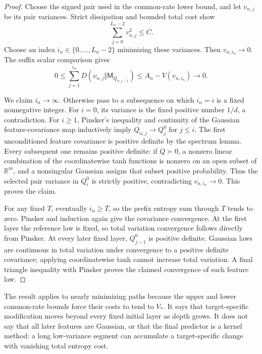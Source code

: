 \begin{proof}
Choose the signed pair used in the common-rate lower bound, and let
$v_{n,j}$ be its pair variances. Strict dissipation and bounded total
cost show
\[
 \sum_{j=0}^{L_n-2}v_{n,j}^2\le C.
\]
Choose an index $i_n\in\{0,\ldots,L_n-2\}$ minimizing these
variances. Then $v_{n,i_n}\to0$. The suffix scalar comparison gives
\[
 0\le\sum_{j=1}^{i_n}
 D(\nu_{n,j}\Vert\mathsf M_{Q_{n,j-1}})
 \le A_n-V(v_{n,i_n})\longrightarrow0.
\]

We claim $i_n\to\infty$. Otherwise pass to a subsequence on which
$i_n=i$ is a fixed nonnegative integer. For $i=0$, its variance is
the fixed positive number $1/d$, a contradiction. For $i\ge1$,
Pinsker's inequality and continuity of the Gaussian feature-covariance
map inductively imply $Q_{n,j}\to Q_j^0$ for $j\le i$.
The first unconditioned feature covariance is positive definite by
the spectrum lemma. Every subsequent one remains positive definite:
if $Q\succ0$, a nonzero linear combination of the coordinatewise
tanh functions is nonzero on an open subset of $\mathbb R^m$,
and a nonsingular Gaussian assigns that subset positive probability.
Thus the selected pair variance in $Q_i^0$ is strictly positive,
contradicting $v_{n,i_n}\to0$. This proves the claim.

For any fixed $T$, eventually $i_n\ge T$, so the prefix entropy
sum through $T$ tends to zero. Pinsker and induction again give the
covariance convergence. At the first layer the reference law is fixed,
so total variation convergence follows directly from Pinsker. At
every later fixed layer, $Q_{j-1}^0$ is positive definite. Gaussian
laws are continuous in total variation under convergence to a positive
definite covariance; applying coordinatewise tanh cannot increase
total variation. A final triangle inequality with Pinsker proves the
claimed convergence of each feature law.
\end{proof}

The result applies to nearly minimizing paths because the upper and
lower common-rate bounds force their costs to tend to $V_*$. It says
that target-specific modification moves beyond every fixed initial
layer as depth grows. It does not say that all later features are
Gaussian, or that the final predictor is a kernel method: a long
low-variance segment can accumulate a target-specific change with
vanishing total entropy cost.
